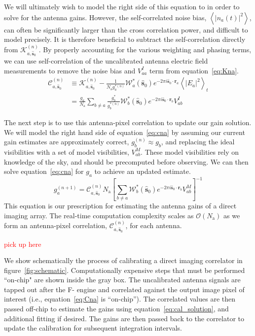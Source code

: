\documentclass[a4paper,fleqn,usenatbib]{mnras}
\newcommand{\Nant}{\ensuremath{N_{\mathrm{a}}}}
\newcommand{\spix}{\ensuremath{\hat{\mathbf{s}}_{0}}}
\newcommand{\Cna}[1][n]{\ensuremath{\mathcal{C}^{(#1)}_{a,\spix}}}
\newcommand{\Kna}[1][n]{\ensuremath{\mathcal{K}^{(#1)}_{a,\spix}}}
\newcommand{\ra}{\ensuremath{\mathbf{r}_a}}
\newcommand{\rb}{\ensuremath{\mathbf{r}_b}}
\begin{document}
We will ultimately wish to model the right side of this equation to in order to solve for the
antenna gains. However, the self-correlated noise bias, $\left<|n_a(t)|^2\right>$, can often be 
significantly larger than the cross correlation power, and difficult to model precisely. It 
is therefore beneficial to subtract the self-correlation directly from $\Kna$. By properly
accounting for the various weighting and phasing terms, we can use self-correlation of the
uncalibrated antenna electric field measurements to remove the noise bias and $V^I_{aa}$
term from equation~\ref{eq:Kna}.
\begin{align}\label{eq:cna}
\Cna & \equiv \Kna - \frac{1}{\Nant g^{*(n)}_a}\mathcal{W}^*_a(\spix)e^{-2\pi i \spix \cdot \ra} \left<|E_a|^2\right>_t\nonumber \\
& = \frac{g_a}{\Nant} \sum_{b\ne a} \frac{g^*_b}{g^{*(n)}_b} \mathcal{W}^*_b(\spix) e^{-2\pi i \spix \cdot \rb} V^I_{ab}
\end{align}

The next step is to use this antenna-pixel correlation to update our gain solution. We will model 
the right hand side of equation~\ref{eq:cna} by assuming our current gain estimates are 
approximately correct, $g^{(n)}_b\approx g_b$, and replacing the ideal visibilities with a set of 
model visibilities, $V^M_{ab}$. These model visibilities rely on knowledge of the sky, and should 
be precomputed before observing. We can then solve equation~\ref{eq:cna} for $g_a$ to achieve an 
updated estimate.
\begin{equation}\label{eq:cal_solution}
g^{(n+1)}_a = \Cna \Nant \left[ \sum_{b\ne a} \mathcal{W}^*_b(\spix) e^{-2\pi i \spix \cdot \rb} V^M_{ab} \right]^{-1}
\end{equation}
This equation is our prescription for estimating the antenna gains of a direct imaging array. The 
real-time computation complexity scales as $\mathcal{O}(\Nant)$ as we form 
an antenna-pixel correlation, $\Cna$, for each 
antenna. 

\textcolor{red}{pick up here}

We show schematically the process of calibrating a direct imaging correlator in 
figure~\ref{fig:schematic}. Computationally expensive steps that must be performed ``on-chip" 
are shown inside the gray box. The uncalibrated antenna signals are tapped out after the F-
engine and correlated against the output image pixel of interest (i.e., equation~\ref{eq:Cna} is 
``on-chip''). The correlated values are then passed off-chip to estimate the gains using 
equation~\ref{eq:cal_solution}, and additional fitting if desired. The gains are then passed back 
to the correlator to update the calibration for subsequent integration intervals. 
\end{document}
